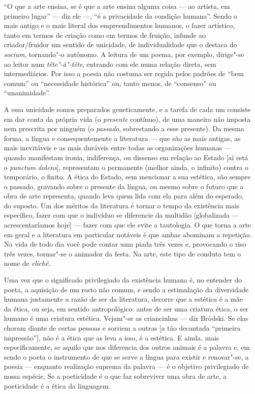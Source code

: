 ``O que a arte ensina, se é que a arte ensina alguma coisa --- ao
artista, em primeiro lugar'' --- diz ele ---, ``é a privacidade da
condição humana''. Sendo o mais antigo e o mais literal dos
empreendimentos humanos, o fazer artístico, tanto em termos de criação
como em termos de fruição, infunde ao criador/fruidor um sentido de
unicidade, de individualidade que o destaca do \emph{socium}, tornando"-o
autônomo. A leitura de um poema, por exemplo, dirige"-se ao leitor num
\emph{tête"-à"-tête}, entrando com ele numa relação direta, sem
intermediários. Por isso a poesia não costuma ser regida pelos padrões
de ``bem comum'' ou ``necessidade histórica'' ou, tanto menos, de
``consenso'' ou ``unanimidade''.

A essa unicidade somos preparados geneticamente, e a tarefa de cada um
consiste em dar conta da própria vida (o \emph{presente} contínuo), de
uma maneira não imposta nem prescrita por ninguém (o \emph{passado},
sobrestando a esse presente). Da mesma forma, a língua e
consequentemente a literatura --- que são as mais antigas, as mais
inevitáveis e as mais duráveis entre todas as organizações humanas ---
quando manifestam ironia, indiferença, ou dissenso em relação ao Estado
[aí está o \emph{punctum dolens}], representam o permanente (melhor ainda, o infinito) contra o temporário, o finito. A ética do
Estado, sem mencionar a sua estética, são sempre o passado, gravando
sobre o presente da língua, ou mesmo sobre o futuro que a obra de arte
representa, quando leva quem lida com ela para além do esperado, do
suposto. Um dos méritos da literatura é tornar o tempo da existência
mais específico, fazer com que o indivíduo se diferencie da multidão
{[}globalizada --- acrescentaríamos hoje{]} --- fazer com que ele evite a
tautologia. O que torna a arte em geral e a literatura em particular
notáveis é que ambas abominam a repetição. Na vida de todo dia você pode
contar uma piada três vezes e, provocando o riso três vezes, tornar"-se o
animador da festa. Na arte, este tipo de conduta tem o nome de
\emph{clichê.}

Uma vez que o significado privilegiado da existência humana é, no
entender do poeta, a aquisição de um rosto não comum, e sendo a
estimulação da diversidade humana justamente a razão de ser da
literatura, decorre que a estética é a mãe da ética, ou seja, em sentido
antropológico: antes de ser uma criatura ética, o ser humano é uma
criatura estética. Vejam"-se as criancinhas --- diz Bródski. Se elas
choram diante de certas pessoas e sorriem a outras {[}a tão decantada
``primeira impressão''{]}, não é a ética que as leva a isso, é a
estética. E ainda, mais especificamente, se aquilo que nos diferencia
dos outros animais é a palavra e, em sendo o poeta o instrumento de que se
serve a língua para existir e renovar"-se, a poesia --- enquanto
realização suprema da palavra --- é o objetivo privilegiado de nossa
espécie. Se a poeticidade é o que faz sobreviver uma obra de arte, a
poeticidade é a ética da linguagem.

